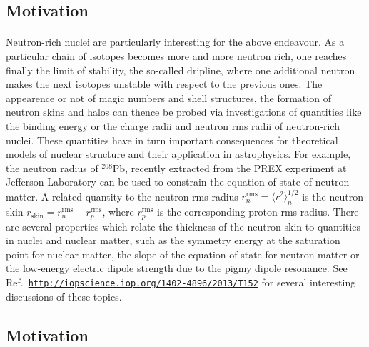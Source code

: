 \documentclass[%
twoside,                 %
final,                   %
10pt]{article}
\begin{document}
\subsection*{Motivation}

\paragraph{}

Neutron-rich nuclei are particularly interesting for the above endeavour. As a particular chain
of isotopes becomes more and more neutron rich, one reaches finally the limit of stability, the so-called
dripline, where one additional neutron makes the next isotopes unstable with respect 
to the previous ones. The appearence or not of magic numbers and shell structures,
the formation of neutron skins and halos
can thence be probed via investigations of quantities like  the binding energy
or the charge radii and neutron rms radii of neutron-rich nuclei. 
These quantities have in turn important 
consequences for theoretical models of nuclear structure and their application in astrophysics.
For example, the neutron radius of ${}^{208}\mbox{Pb}$, recently extracted from the PREX 
experiment at Jefferson Laboratory  can be used to constrain the equation of state of 
neutron matter. A related quantity to the
neutron rms radius $r_n^{\mathrm{rms}}=\langle r^2\rangle_n^{1/2}$ is the neutron skin 
$r_{\mathrm{skin}}=r_n^{\mathrm{rms}}-r_p^{\mathrm{rms}}$,
where $r_p^{\mathrm{rms}}$ is the corresponding proton rms radius.  
There are several properties which relate the thickness of the neutron skin to quantities in nuclei and 
nuclear matter, such as the symmetry energy at the saturation point for nuclear matter, the slope
of the equation of state for neutron matter
or the low-energy electric dipole strength due to the pigmy dipole resonance. 
See Ref.~\href{{http://iopscience.iop.org/1402-4896/2013/T152}}{\nolinkurl{http://iopscience.iop.org/1402-4896/2013/T152}} for several interesting discussions of these topics.



\subsection*{Motivation}

\end{document}
